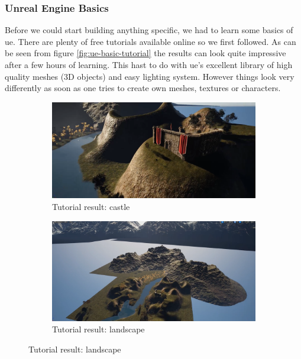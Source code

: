 \documentclass[
  a4paper,  %
  twoside,  %
  bibliography=totoc,
  headsepline,
  cleardoublepage=empty,
  parskip=half,
  draft=false
]{scrbook}
\begin{document}
\subsubsection*{Unreal Engine Basics}
Before we could start building anything specific, we had to learn some basics of \gls{ue}. There are plenty of free tutorials available online so we first followed. As can be seen from figure \ref{fig:ue-basic-tutorial} the results can look quite impressive after a few hours of learning. This hast to do with \gls{ue}'s excellent library of high quality meshes (3D objects) and easy lighting system. However things look very differently as soon as one tries to create own meshes, textures or characters. 

\begin{figure}[h]
  \centering
  \begin{subfigure}{0.45\textwidth}
    \includegraphics[width=\linewidth]{graphics/images/unreal-engine/Basics/Landscape-Castle.png}
    \caption{Tutorial result: castle}
  \end{subfigure}
  \begin{subfigure}{0.45\textwidth}
    \includegraphics[width=\linewidth]{graphics/images/unreal-engine/Basics/Landscape-Overview.png}
    \caption{Tutorial result: landscape}
  \end{subfigure}


\end{figure}
\end{document}

